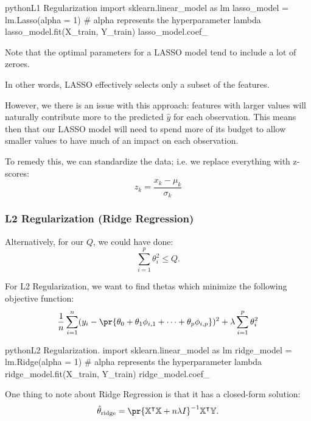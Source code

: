 \documentclass[openany]{book}
\begin{document}
\begin{code}{python}{L1 Regularization}
import sklearn.linear_model as lm
lasso_model = lm.Lasso(alpha = 1) # alpha represents the hyperparameter lambda
lasso_model.fit(X_train, Y_train)
lasso_model.coef_
\end{code}

Note that the optimal parameters for a LASSO model tend to include a lot of zeroes.

In other words, LASSO effectively selects only a subset of the features.

However, we there is an issue with this approach: features with larger values will naturally contribute more to the predicted $\hat y$ for each observation. This means then that our LASSO model will need to spend more of its budget to allow smaller values to have much of an impact on each observation.

To remedy this, we can standardize the data; i.e. we replace everything with z-scores:
\begin{equation*}
	z_k = \dfrac{x_k - \mu_k}{\sigma_k}
\end{equation*}

\subsubsection{L2 Regularization (Ridge Regression)}
Alternatively, for our $Q$, we could have done:
\begin{equation*}
	\sum_{i=1}^{p} \theta_i^{2} \leq Q.
\end{equation*}

\begin{defn}[L2 Regularization]
	For L2 Regularization, we want to find thetas which minimize the following objective function:
	\begin{equation*}
		\dfrac{1}{n} \sum_{i=1}^{n} (y_i - \pr{\theta_0 + \theta_1\phi_{i,1} + \cdots + \theta_p\phi_{i,p}})^{2} + \lambda\sum_{i=1}^{p} \theta_i^{2}
	\end{equation*}
\end{defn}

\begin{code}{python}{L2 Regularization.}
import sklearn.linear_model as lm
ridge_model = lm.Ridge(alpha = 1) # alpha represents the hyperparameter lambda
ridge_model.fit(X_train, Y_train)
ridge_model.coef_

\end{code}

One thing to note about Ridge Regression is that it has a closed-form solution:
\begin{equation*}
	\hat{\theta}_\mathrm{ridge} = \pr{\mathbb X^{\intercal} \mathbb X + n \lambda I}^{-1} \mathbb X^{\intercal} \mathbb Y. 
\end{equation*}
\end{document}
